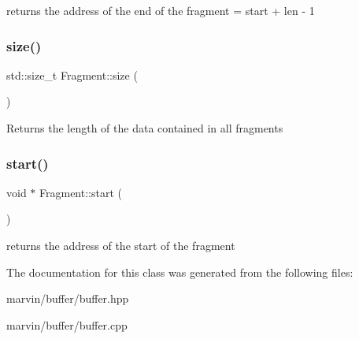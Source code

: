 returns the address of the end of the fragment = start + len -\/ 1 \mbox{\label{class_fragment_a02d9e89fe1680cc9e4b341b046e5b404}} 
\subsubsection{\texorpdfstring{size()}{size()}}
{\footnotesize\ttfamily std\+::size\+\_\+t Fragment\+::size (\begin{DoxyParamCaption}{ }\end{DoxyParamCaption})}

Returns the length of the data contained in all fragments \mbox{\label{class_fragment_a38a4c128d64a67316e1eda8f9c266eaf}} 
\subsubsection{\texorpdfstring{start()}{start()}}
{\footnotesize\ttfamily void $\ast$ Fragment\+::start (\begin{DoxyParamCaption}{ }\end{DoxyParamCaption})}

returns the address of the start of the fragment 

The documentation for this class was generated from the following files\+:\begin{DoxyCompactItemize}
\item 
marvin/buffer/buffer.\+hpp\item 
marvin/buffer/buffer.\+cpp\end{DoxyCompactItemize}
